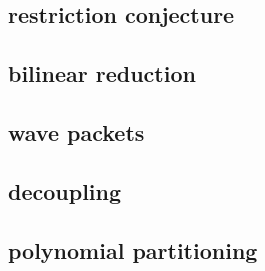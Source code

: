 

\subsection{restriction conjecture}
\label{b2:subsec:230601}

\subsection{bilinear reduction}
\label{b2:subsec:230602}

\subsection{wave packets}
\label{b2:subsec:230603}

\subsection{decoupling}
\label{b2:subsec:230604}

\subsection{polynomial partitioning}
\label{b2:subsec:230605}


